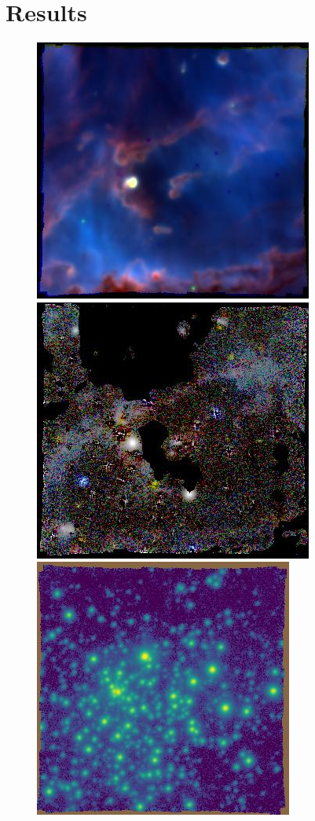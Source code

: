 \documentclass[twocolumn, times]{aastex631}
\begin{document}
\section{Results}
\label{sec:results}

\begin{figure}
  \centering
  \includegraphics[width=0.8\linewidth]{figs/ngc346-rgb}
  \includegraphics[width=0.8\linewidth]{figs/ngc346-rgb-raman}
  \includegraphics[width=0.8\linewidth]{figs/ngc346-stars}

\end{figure}
\end{document}
